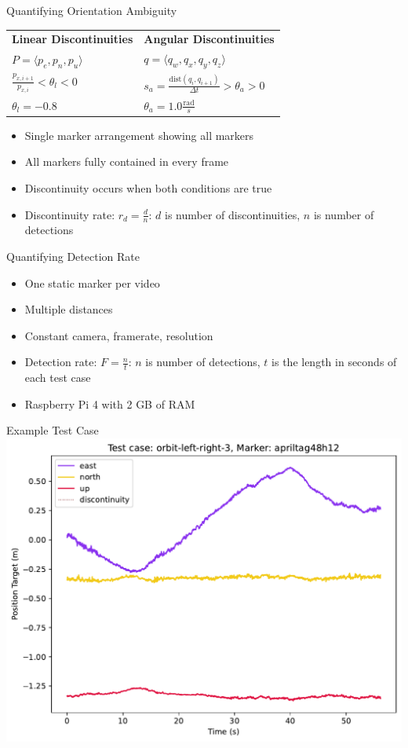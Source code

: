 \documentclass[aspectratio=169]{beamer}
\begin{document}
\begin{frame}{Quantifying Orientation Ambiguity}
	\centering
	\renewcommand{\arraystretch}{2}
	\begin{tabular}{ll}
		\textbf{Linear Discontinuities} & \textbf{Angular Discontinuities}\\
		$P = \langle p_e, p_n, p_u \rangle$ & $q = \langle q_w, q_x, q_y, q_z \rangle$\\
		$\frac{p_{x,i+1}}{p_{x,i}} < \theta_l < 0$ & $s_a = \frac{\mathrm{dist} \left( q_i, q_{i+1} \right) }{\Delta t} > \theta_a > 0$\\
		$\theta_l = -0.8$ & $\theta_a = 1.0 \frac{\mathrm{rad}}{s}$
	\end{tabular}
	\begin{itemize}
		\item Single marker arrangement showing all markers
		\item All markers fully contained in every frame
		\item Discontinuity occurs when both conditions are true
		\item Discontinuity rate: $r_d = \frac{d}{n}$: $d$ is number of discontinuities, $n$ is number of detections
	\end{itemize}
\end{frame}

\begin{frame}{Quantifying Detection Rate}
	\begin{itemize}
		\item One static marker per video
		\item Multiple distances
		\item Constant camera, framerate, resolution
		\item Detection rate: $F=\frac{n}{t}$: $n$ is number of detections, $t$ is the length in seconds of each test case
		\item Raspberry Pi 4 with 2 GB of RAM
	\end{itemize}
\end{frame}

\begin{frame}{Example Test Case}
	\centering
	\includegraphics[width=0.75\linewidth]{images/orbit-left-right-3_apriltag48h12_position-target}
\end{frame}
\end{document}
